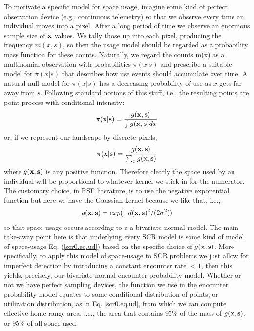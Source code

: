 To motivate a specific model for space usage, imagine some kind of
perfect observation device (e.g., continuous telemetry) so that we
observe every time an individual moves into a pixel. After a long
period of time we observe an enormous sample size of ${\bf x}$
values. We tally those up into each pixel, producing the frequency
$m(x,s)$, so then the usage model should be regarded as a probability
mass function for these counts. Naturally, we regard the counts m(x)
as a multinomial observation with probabilities $\pi(x|s)$ and
prescribe a suitable model for $\pi(x|s)$ that describes how use
events should accumulate over time. A natural null model for
$\pi(x|s)$ has a decreasing probability of use as $x$ gets far away
from $s$.  Following standard notions of this stuff, i.e., the
resulting points are point process with conditional intensity:
\[
\pi({\bf x}|{\bf s}) =  \frac{ g({\bf x},{\bf s}) }{ \int g({\bf
    x},{\bf s}) dx }
\]
or, if we represent our landscape by discrete pixels, 
\begin{equation}
\pi({\bf x}|{\bf s}) =  \frac{ g({\bf x},{\bf s}) }{ \sum_{x} g({\bf
    x},{\bf s}) }
\label{scr0.eq.ud}
\end{equation}
where $g({\bf x},{\bf s})$ is any positive function.
Therefore clearly the space used by an individual will be proportional
to whatever kernel we stick in for the numerator. The customary
choice, in RSF literature, is to use the negative exponential function
but here we have the Gaussian kernel because we like that, i.e.,
\[
 g({\bf x},{\bf s})= exp(  -d({\bf x},{\bf s})^{2}/(2\sigma^{2})) 
\]
so that space usage occurs according to a a bivariate normal model.
The main take-away point here is that underlying every SCR model is
some kind of model of space-usage Eq. (\ref{scr0.eq.ud}) based on the
specific choice of $g({\bf x},{\bf s})$.  More specifically, to apply
this model of space-usage to SCR problems we just allow for imperfect
detection by introducing a constant encounter rate $<1$, then this
yields, precisely, our bivariate normal encounter probability model.
Whether or not we have perfect sampling devices, the function we use
in the encounter probability model equates to some conditional
distribution of points, or utilization distribution, as in
Eq. \ref{scr0.eq.ud}, from which we can compute effective home range
area, i.e., the area that contains 95\% of the mass of $g({\bf x},{\bf
  s})$, or 95\% of all space used.

